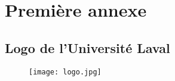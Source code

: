 \appendix

\section{Première annexe}
\label{annexe_1}

\subsection{Logo de l'Université Laval}
\label{logo_laval}

\begin{figure}[H]
    \centering
    \texttt{[image: logo.jpg]}
\end{figure}